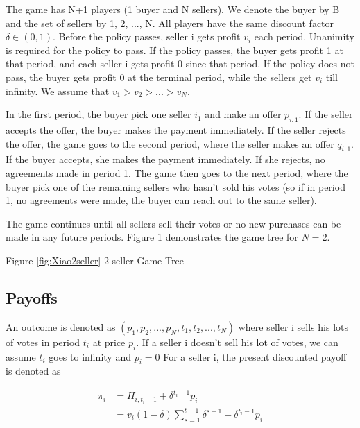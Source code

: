 \documentclass[ProjectGAZ]{subfiles}
\begin{document}
The game has N+1 players (1 buyer and N sellers). We denote the buyer by B and the set of sellers by {1, 2, ..., N}. All players have the same discount factor $\delta \in (0, 1)$. Before the policy passes, seller i gets profit $v_i$ each period. Unanimity is required for the policy to pass. If the policy passes, the buyer gets profit 1 at that period, and each seller i gets profit 0 since that period. If the policy does not pass, the buyer gets profit 0 at the terminal period, while the sellers get $v_i$ till infinity. We assume that $v_1 > v_2 > ... > v_N$.

In the first period, the buyer pick one seller $i_1$ and make an offer $p_{i,1}$. If the seller accepts the offer, the buyer makes the payment immediately. If the seller rejects the offer, the game goes to the second period, where the seller makes an offer $q_{i, 1}$. If the buyer accepts, she makes the payment immediately. If she rejects, no agreements made in period 1. The game then goes to the next period, where the buyer pick one of the remaining sellers who hasn't sold his votes (so if in period 1, no agreements were made, the buyer can reach out to the same seller).

The game continues until all sellers sell their votes or no new purchases can be made in any future periods. Figure 1 demonstrates the game tree for $N = 2$.

\providecommand{\figName}{Xiao2seller}
\providecommand{\figFile}{\figName}
\hypertarget{\figFile}{}


Figure \ref{fig:Xiao2seller} 2-seller Game Tree %

\subsection{Payoffs}\label{subsec:Xiao-Payoff}

An outcome is denoted as $(p_1, p_2, ..., p_N, t_1, t_2, ..., t_N)$ where seller i sells his lots of votes in period $t_i$ at price $p_i$. If a seller i doesn't sell his lot of votes, we can assume $t_i$ goes to infinity and $p_i= 0$  For a seller i, the present discounted payoff is denoted as

\begin{align}
  \pi_i &= H_{i, t_i-1} + \delta^{t_i-1}p_i \\
        &= v_i(1-\delta)\sum_{s=1}^{t-1} \delta^{s-1} + \delta^{t_i-1}p_i  \label{eq:XiaoSPO}
\end{align}
\end{document}
